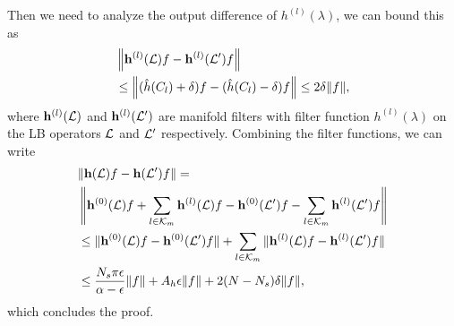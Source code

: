 Then we need to analyze the output difference of $h^{(l)}(\lambda)$, we can bound this as
\begin{align}
    \nonumber &\left\| {\mathbf h}^{(l)}({\mathcal L})f -{\mathbf h}^{(l)}({\mathcal L}')f \right\| 
    \\& \leq \left\| (\hat{h}(C_l)+\delta)f -(\hat{h}(C_l)-\delta)f\right\| \leq 2\delta\|f\|,
\end{align}
where ${\mathbf h}^{(l)}({\mathcal L})$ and ${\mathbf h}^{(l)}({\mathcal L}')$ are manifold filters with filter function $h^{(l)}(\lambda)$ on the LB operators ${\mathcal L}$ and ${\mathcal L}'$ respectively.
Combining the filter functions, we can write
\begin{align}
   \nonumber &\|{\mathbf h}({\mathcal L})f-{\mathbf h}({\mathcal L}')f\|=\\&
    \left\|{\mathbf h}^{(0)}({\mathcal L})f +\sum_{l\in{\ensuremath{\mathcal K}}_m}{\mathbf h}^{(l)}({\mathcal L})f - {\mathbf h}^{(0)}({\mathcal L}')f - \sum_{l\in{\ensuremath{\mathcal K}}_m} {\mathbf h}^{(l)}({\mathcal L}')f \right\|\\
    &\leq \|{\mathbf h}^{(0)}({\mathcal L})f-{\mathbf h}^{(0)}({\mathcal L}')f\|+\sum_{l\in{\ensuremath{\mathcal K}}_m}\|{\mathbf h}^{(l)}({\mathcal L})f-{\mathbf h}^{(l)}({\mathcal L}')f\|\\
    &\label{eqn:sta-filter-alpha}\leq \frac{N_s\pi\epsilon}{\alpha-\epsilon}\|f\| + A_h\epsilon\|f\| +2(N-N_s)\delta\|f\|,
\end{align}
which concludes the proof.


